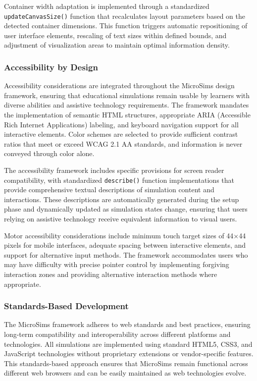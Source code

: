 Container width adaptation is implemented through a standardized \texttt{updateCanvasSize()} function that recalculates layout parameters based on the detected container dimensions. This function triggers automatic repositioning of user interface elements, rescaling of text sizes within defined bounds, and adjustment of visualization areas to maintain optimal information density.

\subsubsection{Accessibility by Design}

Accessibility considerations are integrated throughout the MicroSims design framework, ensuring that educational simulations remain usable by learners with diverse abilities and assistive technology requirements. The framework mandates the implementation of semantic HTML structures, appropriate ARIA (Accessible Rich Internet Applications) labeling, and keyboard navigation support for all interactive elements. Color schemes are selected to provide sufficient contrast ratios that meet or exceed WCAG 2.1 AA standards, and information is never conveyed through color alone.

The accessibility framework includes specific provisions for screen reader compatibility, with standardized \texttt{describe()} function implementations that provide comprehensive textual descriptions of simulation content and interactions. These descriptions are automatically generated during the setup phase and dynamically updated as simulation states change, ensuring that users relying on assistive technology receive equivalent information to visual users.

Motor accessibility considerations include minimum touch target sizes of 44×44 pixels for mobile interfaces, adequate spacing between interactive elements, and support for alternative input methods. The framework accommodates users who may have difficulty with precise pointer control by implementing forgiving interaction zones and providing alternative interaction methods where appropriate.

\subsubsection{Standards-Based Development}

The MicroSims framework adheres to web standards and best practices, ensuring long-term compatibility and interoperability across different platforms and technologies. All simulations are implemented using standard HTML5, CSS3, and JavaScript technologies without proprietary extensions or vendor-specific features. This standards-based approach ensures that MicroSims remain functional across different web browsers and can be easily maintained as web technologies evolve.

